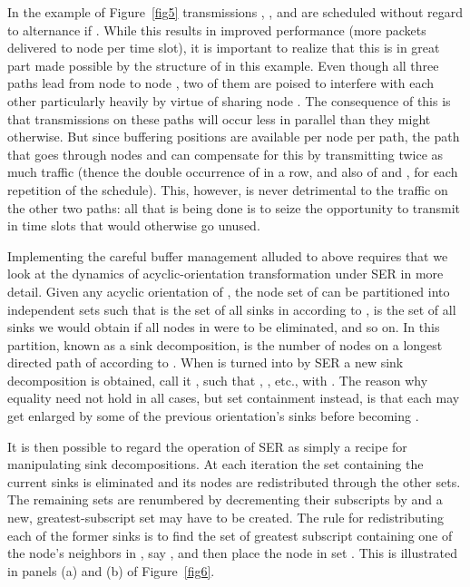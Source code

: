 \documentclass{article}
\begin{document}
In the example of Figure~\ref{fig5} transmissions , , and  are
scheduled without regard to alternance if . While this results in improved
performance (more packets delivered to node  per time slot), it is important
to realize that this is in great part made possible by the structure of  in
this example. Even though all three paths lead from node  to node , two of
them are poised to interfere with each other particularly heavily by virtue of
sharing node . The consequence of this is that transmissions on these paths
will occur less in parallel than they might otherwise. But since  buffering
positions are available per node per path, the path that goes through nodes 
and  can compensate for this by transmitting twice as much traffic (thence
the double occurrence of  in a row, and also of  and , for each
repetition of the schedule). This, however, is never detrimental to the traffic
on the other two paths: all that is being done is to seize the opportunity to
transmit in time slots that would otherwise go unused.

Implementing the careful buffer management alluded to above requires that we
look at the dynamics of acyclic-orientation transformation under SER in more
detail. Given any acyclic orientation  of , the node set  of 
can be partitioned into independent sets  such that  is
the set of all sinks in  according to ,  is the set of all sinks
we would obtain if all nodes in  were to be eliminated, and so on. In this
partition, known as a sink decomposition,  is the number of nodes on a
longest directed path of  according to . When  is turned into
 by SER a new sink decomposition is obtained, call it
, such that , , etc.,
with . The reason why equality need not hold in all cases, but set
containment instead, is that each  may get enlarged by some of the previous
orientation's sinks before becoming .

It is then possible to regard the operation of SER as simply a recipe for
manipulating sink decompositions. At each iteration the set containing the
current sinks is eliminated and its nodes are redistributed through the other
sets. The remaining sets are renumbered by decrementing their subscripts by 
and a new, greatest-subscript set may have to be created. The rule for
redistributing each of the former sinks is to find the set of greatest subscript
containing one of the node's neighbors in , say , and then place the
node in set . This is illustrated in panels (a) and (b) of
Figure~\ref{fig6}.
\end{document}
